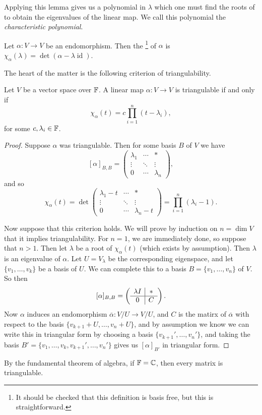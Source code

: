 \documentclass[a4paper]{scrartcl}
\begin{document}
Applying this lemma gives us a polynomial in $\lambda$ which one must find the roots of to obtain the eigenvalues of the linear map. We call this polynomial the \emph{characteristic polynomial}.

\begin{definition}
    Let $\alpha: V \rightarrow V$ be an endomorphism. Then the \footnote{It should be checked that this definition is basis free, but this is straightforward.} of $\alpha$ is $\chi_{\alpha}(\lambda) = \det(\alpha - \lambda \operatorname{id})$.
\end{definition}

The heart of the matter is the following criterion of triangulability.

\begin{theorem}
    Let $V$ be a vector space over $\mathbb{F}$.
    A linear map $\alpha: V \rightarrow V$ is triangulable if and only if
    $$
    \chi_{\alpha}(t) = c \prod_{i = 1}^n (t - \lambda_i),
    $$
    for some $c, \lambda_i\in \mathbb{F}$.
\end{theorem}
\begin{proof}
    Suppose $\alpha$ was triangulable. Then for some basis $B$ of $V$ we have
    $$
    [\alpha]_{B, B} = \begin{pmatrix}
        \lambda_1 & \cdots & * \\
        \vdots & \ddots & \vdots \\
        0 & \cdots & \lambda_n
    \end{pmatrix}, 
    $$
    and so
    $$
    \chi_{\alpha}(t) = \det  \begin{pmatrix}
        \lambda_1 - t & \cdots & * \\
        \vdots & \ddots & \vdots \\
        0 & \cdots & \lambda_n - t
    \end{pmatrix} = \prod_{i = 1}^n(\lambda_i - 1).
    $$

    Now suppose that this criterion holds. We will prove by induction on $n = \dim V$ that it implies triangulability. For $n = 1$, we are immediately done, so suppose that $n > 1$. Then let $\lambda$ be a root of $\chi_{\alpha}(t)$ (which exists by assumption). Then $\lambda$ is an eigenvalue of $\alpha$. Let $U = V_\lambda$ be the corresponding eigenspace, and let $\{v_1, \dots, v_k\}$ be a basis of $U$. We can complete this to a basis $B = \{v_1, \dots, v_n\}$ of $V$. So then
    $$
    [\alpha]_{B, B} = \left(\begin{array}{ c | c }
                \lambda I & *\\
                \hline
                0 & C
              \end{array}\right).
    $$
    Now $\alpha$ induces an endomorphism $\overline{\alpha} : V / U \rightarrow V / U$, and $C$ is the matirx of $\overline{\alpha}$ with respect to the basis $\{v_{k + 1} + U, \dots, v_n + U\}$, and by assumption we know we can write this in triangular form by choosing a basis $\{v_{k + 1}', \dots, v_n'\}$, and taking the basis $B' = \{v_1, \dots, v_k, v_{k + 1}', \dots, v_n'\}$ gives us $[\alpha]_{B'}$ in triangular form.
\end{proof}
\begin{remark}
    By the fundamental theorem of algebra, if $\mathbb{F} = \mathbb{C}$, then every matrix is triangulable.
\end{remark}
\end{document}
